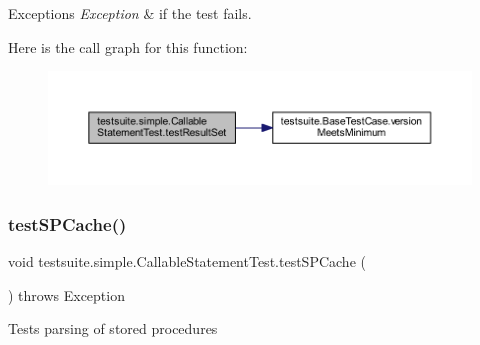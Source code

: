 \begin{DoxyExceptions}{Exceptions}
{\em Exception} & if the test fails. \\
\hline
\end{DoxyExceptions}
Here is the call graph for this function\+:
\nopagebreak
\begin{figure}[H]
\begin{center}
\leavevmode
\includegraphics[width=350pt]{classtestsuite_1_1simple_1_1_callable_statement_test_a8007b7089823f54d85bc02cf1c5427e8_cgraph}
\end{center}
\end{figure}
\mbox{\label{classtestsuite_1_1simple_1_1_callable_statement_test_ac41eeda6e62222c52818858c877b29f3}} 
\subsubsection{\texorpdfstring{test\+S\+P\+Cache()}{testSPCache()}}
{\footnotesize\ttfamily void testsuite.\+simple.\+Callable\+Statement\+Test.\+test\+S\+P\+Cache (\begin{DoxyParamCaption}{ }\end{DoxyParamCaption}) throws Exception}

Tests parsing of stored procedures


